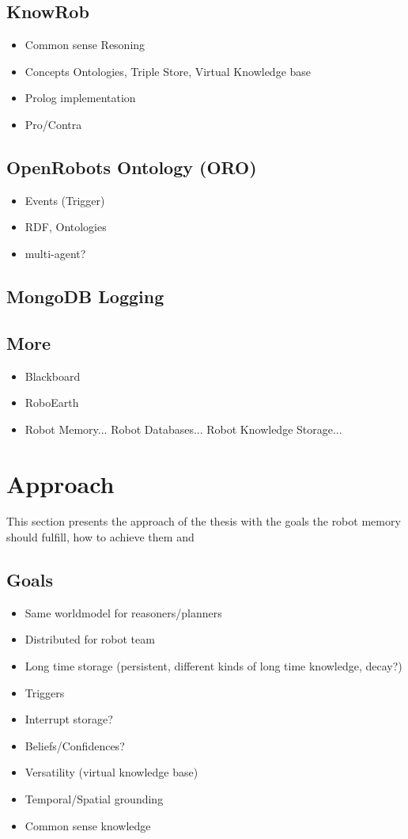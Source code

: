 \documentclass[a4paper,11pt]{article}
\begin{document}
\subsection{KnowRob}
\label{sec:knowrob}
\begin{itemize}
\item Common sense Resoning
\item Concepts Ontologies, Triple Store, Virtual Knowledge base
\item Prolog implementation
\item Pro/Contra
\end{itemize}
\subsection{OpenRobots Ontology (ORO)}
\begin{itemize}
\item Events (Trigger)
\item RDF, Ontologies
\item multi-agent?
\end{itemize}
\subsection{MongoDB Logging}
\label{sec:mongo-logging}
\subsection{More}
\begin{itemize}
\item Blackboard
\item RoboEarth
\item Robot Memory... Robot Databases... Robot Knowledge Storage...
\end{itemize}


\section{Approach}
\label{sec:approach}
This section presents the approach of the thesis with the goals the robot memory should fulfill, how to achieve them and 

\subsection{Goals}
\label{sec:goals}
\begin{itemize}
\item Same worldmodel for reasoners/planners
\item Distributed for robot team
\item Long time storage (persistent, different kinds of long time knowledge, decay?)
\item Triggers
\item Interrupt storage?
\item Beliefs/Confidences?
\item Versatility (virtual knowledge base)
\item Temporal/Spatial grounding
\item Common sense knowledge
\end{itemize}
\end{document}
